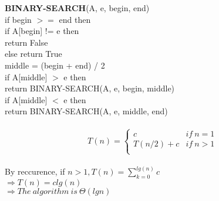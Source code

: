 \documentclass{article}
\begin{document}
\noindent\textbf{BINARY-SEARCH}(A, e, begin, end)\\
\indent if begin $>=$ end then\\
\indent \indent if A[begin] != e then \\
\indent \indent \indent return False\\
\indent \indent else return True\\
\indent middle = (begin + end) / 2\\
\indent if A[middle] $>$ e then \\
\indent \indent \indent return BINARY-SEARCH(A, e, begin, middle)\\
\indent if A[middle] $<$ e then\\
\indent \indent \indent return BINARY-SEARCH(A, e, middle, end)\\\\
\begin{equation}
T(n) =
\begin{cases} c &if \ n = 1\\
  T(n/2)  + c &if \ n > 1\\
\end{cases}
\end{equation}\\
\noindent By reccurence, if $n > 1, T(n) = \sum_{k=0}^{lg(n)}c$\\
$\Rightarrow T(n) = clg(n)$\\
$\Rightarrow The \ algorithm \ is \ \Theta(lgn)$
\end{document}
